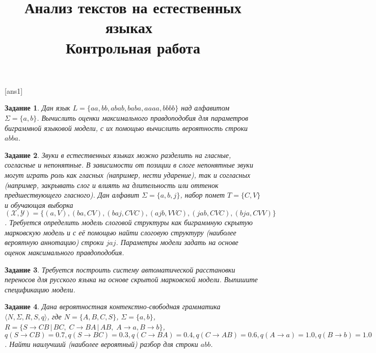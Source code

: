 \documentclass[10pt]{article}
\theoremstyle{example-style}
\newtheorem{example}{Задание}
\begin{document}
 

\title{Анализ текстов на естественных языках\ \\{\large Контрольная работа}}
\author{}
\date{}

\maketitle

[ans1]


\begin{example}
Дан язык $L = \{aa, bb, abab, baba, aaaa, bbbb\}$ над алфавитом $\Sigma = \{a, b\}$. Вычислить оценки максимального правдоподобия для параметров биграммной языковой модели, с их помощью вычислить вероятность строки $abba$.
\end{example}

\begin{example}
Звуки в естественных языках можно разделить на гласные, согласные и непонятные. В зависимости от позиции в слоге непонятные звуки могут играть роль как гласных (например, нести ударение), так и согласных (например, закрывать слог и влиять на длительность или оттенок предшествующего гласного). Дан алфавит $\Sigma = \{a, b, j\}$, набор помет $T = \{C, V\}$ и обучающая выборка $(\mathcal{X}, \mathcal{Y}) = \{(a, V), (ba, CV), (baj, CVC), (ajb, VVC), (jab, CVC), (bja, CVV) \}$. Требуется определить модель слоговой структуры как биграммную скрытую марковскую модель и с её помощью найти слоговую структуру (наиболее вероятную аннотацию) строки $jaj$. Параметры модели задать на основе оценок максимального правдоподобия.
\end{example}

\begin{example}
Требуется построить систему автоматической расстановки переносов для русского языка на основе скрытой марковской модели. Выпишите спецификацию модели.
\end{example}

\begin{example}
Дана вероятностная контекстно-свободная грамматика $\langle N, \Sigma, R, S, q \rangle$, где $N = \{ A, B, C, S \}$, $\Sigma = \{a, b\}$,
$R = \{ S \to CB \, | \, BC, \; C \to BA \, | \, AB, \; A \to a, B \to b \}$, 
$q(S \to CB) = 0.7, q(S \to BC) = 0.3, q(C \to BA) = 0.4, q(C \to AB) = 0.6, q(A \to a) = 1.0, q(B \to b) = 1.0$.
Найти наилучший (наиболее вероятный) разбор для строки $abb$.
\end{example}

\end{document}
